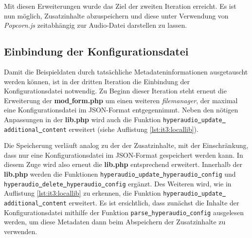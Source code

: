 Mit diesen Erweiterungen wurde das Ziel der zweiten Iteration erreicht. Es ist nun möglich, Zusatzinhalte abzuspeichern und diese unter Verwendung von \textit{Popcorn.js} zeitabhängig zur Audio-Datei darstellen zu lassen.

\subsection{Einbindung der Konfigurationsdatei}
Damit die Beispieldaten durch tatsächliche Metadateninformationen ausgetauscht werden können, ist in der dritten Iteration die Einbindung der Konfigurationsdatei notwendig. Zu Beginn dieser Iteration steht erneut die Erweiterung der \textbf{mod\underline{{ }}form.php} um einen weiteren \textit{filemanager}, der maximal eine Konfigurationsdatei im JSON-Format entgegennimmt. Neben den nötigen Anpassungen in der \textbf{lib.php} wird auch die Funktion \texttt{hyperaudio\underline{{ }}update\underline{{ }}additional\underline{{ }}content} erweitert (siehe Auflistung \ref{lst:it3:locallib}).



Die Speicherung verläuft analog zu der der Zusatzinhalte, mit der Einschränkung, dass nur eine Konfigurationsdatei im JSON-Format gespeichert werden kann. In diesem Zuge wird also erneut die \textbf{lib.php} entsprechend erweitert. Innerhalb der \textbf{lib.php} werden die Funktionen \texttt{hyperaudio\underline{{ }}update\underline{{ }}hyperaudio\underline{{ }}config} und \texttt{hyperaudio\underline{{ }}delete\underline{{ }}hyperaudio\underline{{ }}config} ergänzt. Des Weiteren wird, wie in Auflistung \ref{lst:it3:locallib} zu erkennen, die Funktion \texttt{hyperaudio\underline{{ }}update\underline{{ }}additional\underline{{ }}content} erweitert. Es ist ersichtlich, dass zunächst die Inhalte der Konfigurationsdatei mithilfe der Funktion \texttt{parse\underline{{ }}hyperaudio\underline{{ }}config} ausgelesen werden, um diese Metadaten dann beim Abspeichern der Zusatzinhalte zu verwenden.


